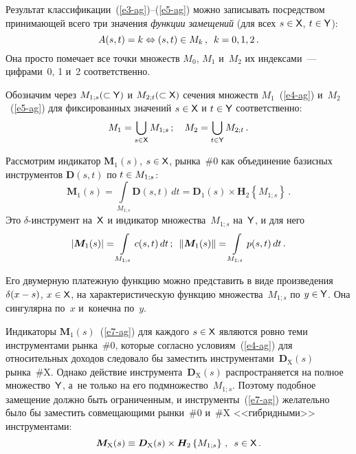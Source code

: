 \begin{multicols}{2}
  Результат классификации~(\ref{e3-ag})--(\ref{e5-ag}) можно записывать 
посредством принимающей всего три значения \textit{функции замещений} (для 
всех $s \hm\in{\sf X}$, $t \hm\in {\sf Y}$):
  \begin{equation}
  A(s,t)=k\Leftrightarrow (s,t)\in M_k\,,\enskip k=0,1,2\,.
  \label{e6-ag}
  \end{equation}
    Она просто помечает все точки множеств $M_0$, $M_1$ и~$M_2$ их 
индексами~--- цифрами~0, 1 и~2 соответственно. 
  
  Обозначим через $M_{1;s}(\subset {\sf Y})$ и $M_{2;t}(\subset {\sf X})$ 
сечения множеств $M_{1}$~(\ref{e4-ag}) и~$M_2$~(\ref{e5-ag}) для фиксированных 
значений $s\hm\in{\sf X}$ и $t\hm\in {\sf Y}$ соответственно: 
  $$
  M_1=\bigcup\limits_{s\in{\sf X}} M_{1;s}\,;\quad M_2=\bigcup_{t\in {\sf Y}} 
M_{2;t}\,.
  $$
  
  Рассмотрим индикатор $\boldsymbol{M}_1(s)$, $s \hm\in{\sf X}$, рынка~\#0 
как объединение базисных инструментов $\boldsymbol{D}(s, t)$ по $t \hm\in 
M_{1;s}$: 
  \begin{equation}
  \boldsymbol{M}_1(s)=\int\limits_{M_{1;s}} \boldsymbol{D}(s,t)\,dt 
=\boldsymbol{D}_1(s)\times \boldsymbol{H}_2\left\{ M_{1;s}\right\}\,.
  \label{e7-ag}
  \end{equation}
    Это $\delta$-ин\-стру\-мент на~${\sf X}$ и индикатор 
множества~$M_{1;s}$ на~${\sf Y}$, и для него 
  $$
  \left\vert \boldsymbol{M}_1(s)\right\vert =\int\limits_{M_{1;s}} 
c(s,t)\,dt\,;\enskip
  \left\| \boldsymbol{M}_1(s)\right\| =\int\limits_{M_{1;s}} p(s,t)\,dt\,.
  $$
  
  Его двумерную платежную функцию можно представить в виде 
произведения $\delta(x \hm- s)$, $x \hm\in {\sf X}$, на характеристическую 
функцию множества~$M_{1;s}$ по $y \hm\in {\sf  Y}$. Она сингулярна по~$x$ 
и~конечна по~$y$. 
  
  Индикаторы $\boldsymbol{M}_1(s)$~(\ref{e7-ag}) для каждого  $s \hm \in   
{\sf  X}$ являются ровно теми инструментами рынка~\#0, которые согласно 
условиям~(\ref{e4-ag}) для относительных доходов следовало бы заместить 
инструментами~$\boldsymbol{D}_{\mathrm{X}}(s)$ рынка~\#X. Однако действие 
инструмента~$\boldsymbol{D}_{\mathrm{X}}(s)$ распространяется на полное 
множество~${\sf Y}$, а~не только на его подмножество~$M_{1;s}$. Поэтому 
подобное замещение должно быть ограниченным, и инструменты~(\ref{e7-ag}) 
желательно было бы заместить совмещающими рынки~\#0 и~\#X 
<<гибридными>> инструментами: 
  \begin{equation}
  \boldsymbol{M}_{\mathrm{X}}(s)\equiv 
\boldsymbol{D}_{\mathrm{X}}(s)\times \boldsymbol{H}_2\left\{ 
M_{1;s}\right\}\,,\enskip s\in {\sf X}\,.
  \label{e8-ag}
  \end{equation}
  

\end{multicols}
